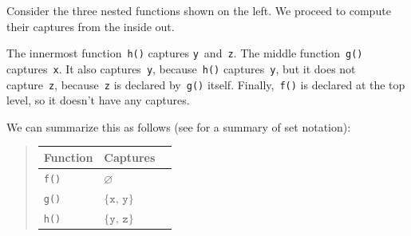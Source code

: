 \documentclass[../generics]{subfiles}
\begin{document}
Consider the three nested functions shown on the left. We proceed to compute their captures from the inside out.

The innermost function~\texttt{h()} captures \texttt{y}~and~\texttt{z}. The middle function~\texttt{g()} captures~\texttt{x}. It also captures~\texttt{y}, because~\texttt{h()} captures~\texttt{y}, but it does not capture~\texttt{z}, because~\texttt{z} is declared by~\texttt{g()} itself. Finally,~\texttt{f()} is declared at the top level, so it doesn't have any captures.

We can summarize this as follows (see  for a summary of set notation):
\begin{quote}
\qquad\qquad
\begin{tabular}{lll}
\toprule
\textbf{Function}&\textbf{Captures}\\
\midrule
\texttt{f()}&$\varnothing$\\
\texttt{g()}&$\{\texttt{x},\,\texttt{y}\}$\\
\texttt{h()}&$\{\texttt{y},\,\texttt{z}\}$\\
\bottomrule
\end{tabular}
\end{quote}

\bigskip
\end{document}

